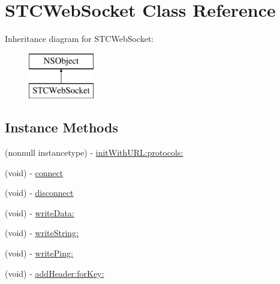 \hypertarget{interface_s_t_c_web_socket}{}\section{S\+T\+C\+Web\+Socket Class Reference}
\label{interface_s_t_c_web_socket}
Inheritance diagram for S\+T\+C\+Web\+Socket\+:\begin{figure}[H]
\begin{center}
\leavevmode
\includegraphics[height=2.000000cm]{interface_s_t_c_web_socket}
\end{center}
\end{figure}
\subsection*{Instance Methods}
\begin{DoxyCompactItemize}
\item 
(nonnull instancetype) -\/ \hyperlink{interface_s_t_c_web_socket_a748e5be92eae2e05f70f26756b8d7e64}{init\+With\+U\+R\+L\+:protocols\+:}
\item 
(void) -\/ \hyperlink{interface_s_t_c_web_socket_a19172c26477af8b2f31e00d6ad65786c}{connect}
\item 
(void) -\/ \hyperlink{interface_s_t_c_web_socket_a6001ae9ed7f1758b92bf8d85bbd42fe5}{disconnect}
\item 
(void) -\/ \hyperlink{interface_s_t_c_web_socket_aa01158bb007d83492e3b6854d873a79a}{write\+Data\+:}
\item 
(void) -\/ \hyperlink{interface_s_t_c_web_socket_ade901b3fd9c09fddfb92dcb0cd8803fb}{write\+String\+:}
\item 
(void) -\/ \hyperlink{interface_s_t_c_web_socket_aa9649b3dcf83928d0cd204e11d798fd9}{write\+Ping\+:}
\item 
(void) -\/ \hyperlink{interface_s_t_c_web_socket_a23fa67b7bee39fb6570f8d19fb2c38a2}{add\+Header\+:for\+Key\+:}
\end{DoxyCompactItemize}
